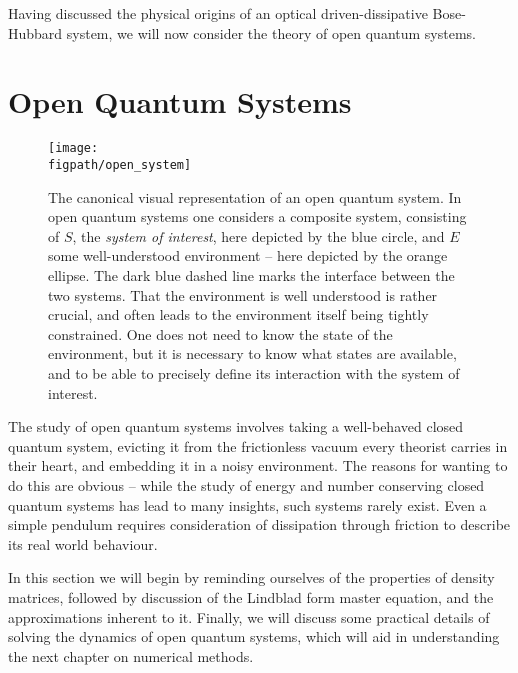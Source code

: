 Having discussed the physical origins of an optical driven-dissipative Bose-Hubbard system, we will now consider the theory of open quantum systems.

\section{Open Quantum Systems}

\begin{figure}[ht!]
\centering
\texttt{[image: \\figpath/open\_system]}
\caption{The canonical visual representation of an open quantum system. In open quantum systems one considers a composite system, consisting of \(S\), the \emph{system of interest}, here depicted by the blue circle, and \(E\) some well-understood environment -- here depicted by the orange ellipse. The dark blue dashed line marks the interface between the two systems. That the environment is well understood is rather crucial, and often leads to the environment itself being tightly constrained. One does not need to know the state of the environment, but it is necessary to know what states are available, and to be able to precisely define its interaction with the system of interest.}
\label{fig:oqs1-1}
\end{figure}

The study of open quantum systems involves taking a well-behaved closed quantum system, evicting it from the frictionless vacuum every theorist carries in their heart, and embedding it in a noisy environment. The reasons for wanting to do this are obvious -- while the study of energy and number conserving closed quantum systems has lead to many insights, such systems rarely exist. Even a simple pendulum requires consideration of dissipation through friction to describe its real world behaviour.  

In this section we will begin by reminding ourselves of the properties of density matrices, followed by discussion of the Lindblad form master equation, and the approximations inherent to it. Finally, we will discuss some practical details of solving the dynamics of open quantum systems, which will aid in understanding the next chapter on numerical methods.

